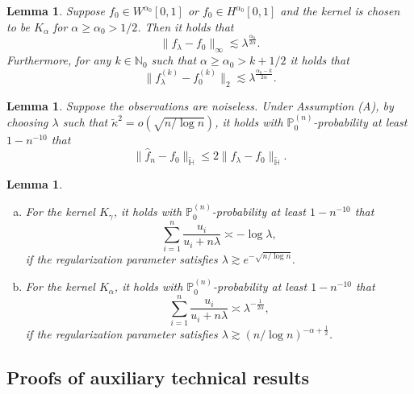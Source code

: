 \documentclass[12pt]{article}
\newcommand{\PP}{\mathbb{P}}
\newcommand{\bbH}{\mathbb{H}}
\theoremstyle{plain}
\newtheorem{lemma}[theorem]{Lemma}
\theoremstyle{nonitalicremark}
\begin{document}
\begin{appendices}
\begin{lemma}\label{lem:poly.mismatch.deterministic}
Suppose $f_0\in W^{\alpha_0}[0,1]$ or $f_0\in H^{\alpha_0}[0,1]$ and the kernel is chosen to be $K_\alpha$ for $\alpha \geq \alpha_0 > 1/2$. Then it holds that
\begin{equation}
\|f_\lambda - f_0\|_\infty \lesssim \lambda^{\frac{\alpha_0}{2\alpha}}.
\end{equation}
Furthermore, for any $k\in\mathbb{N}_0$ such that $\alpha \geq \alpha_0 > k+1/2$ it holds that
\begin{equation}
\|f_\lambda^{(k)} - f_0^{(k)}\|_2 \lesssim \lambda^{\frac{\alpha_0-k}{2\alpha}}.
\end{equation}
\end{lemma}


\begin{lemma}\label{cor:h.tilde.noiseless}
Suppose the observations are noiseless. Under Assumption (A), by choosing $\lambda$ such that $\tilde{\kappa}^2=o(\sqrt{n/\log n})$, it holds with $\PP_0^{(n)}$-probability at least $1 - n^{-10}$ that
\begin{equation}
\|\hat{f}_n-f_0\|_{\tilde{\bbH}}\leq 2\|f_\lambda-f_0\|_{\tilde{\bbH}}.
\end{equation}
\end{lemma}


\begin{lemma}\label{lem:finite.sum}
\begin{enumerate}[(a)]
\item For the kernel $K_\gamma$, it holds with $\PP_0^{(n)}$-probability at least $1-n^{-10}$ that
\begin{equation}
\sum_{i=1}^n \frac{u_i}{u_i + n\lambda} \asymp -\log\lambda,
\end{equation}
if the regularization parameter satisfies $\lambda \gtrsim e^{-\sqrt{n/\log n}}$.
\item For the kernel $K_\alpha$, it holds with $\PP_0^{(n)}$-probability at least $1-n^{-10}$ that
\begin{equation}
\sum_{i=1}^n \frac{u_i}{u_i + n\lambda} \asymp \lambda^{-\frac{1}{2\alpha}},
\end{equation}
if the regularization parameter satisfies $\lambda \gtrsim (n/\log n)^{-\alpha + \frac{1}{2}}$.
\end{enumerate}
\end{lemma}


\subsection{Proofs of auxiliary technical results}


\end{appendices}
\end{document}
